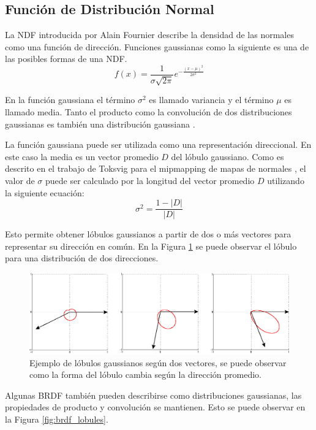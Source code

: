 \subsection{Función de Distribución Normal}
La \ac{NDF} introducida por Alain Fournier \cite{fournier1992d} describe la densidad de las normales como una función de dirección. Funciones gaussianas como la siguiente es una de las posibles formas de una \ac{NDF}.
\begin{equation}
    f(x) = \frac{1}{\sigma\sqrt{2\pi}}e^{-\frac{(x-\mu)^2}{2\sigma^2}}
    \label{eq:ndf_ex1}
\end{equation}

En la función gaussiana el término $\sigma^2$ es llamado variancia y el término $\mu$ es llamado media. Tanto el producto como la convolución de dos distribuciones gaussianas es también una distribución gaussiana \cite{tina-2003}.

La función gaussiana puede ser utilizada como una representación direccional. En este caso la media es un vector promedio $D$ del lóbulo gaussiano. Como es descrito en el trabajo de Toksvig para el mipmapping de mapas de normales \cite{Toksvig05}, el valor de $\sigma$ puede ser calculado por la longitud del vector promedio $D$ utilizando la siguiente ecuación:
\begin{equation}
    \sigma^2 = \frac{1-|D|}{|D|}
    \label{eq:gaussia_eq}
\end{equation}

Esto permite obtener lóbulos gaussianos a partir de dos o más vectores para representar su dirección en común. En la Figura \ref{fig:lobes_example} se puede observar el lóbulo para una distribución de dos direcciones.

\begin{figure}[H]
	\centering
	\includegraphics[width=0.85\linewidth]{media/lobes.eps}
	\caption{Ejemplo de lóbulos gaussianos según dos vectores, se puede observar como la forma del lóbulo cambia según la dirección promedio.}
	\label{fig:lobes_example}
\end{figure}

Algunas \ac{BRDF} también pueden describirse como distribuciones gaussianas, las propiedades de producto y convolución se mantienen. Esto se puede observar en la Figura \ref{fig:brdf_lobules}.

